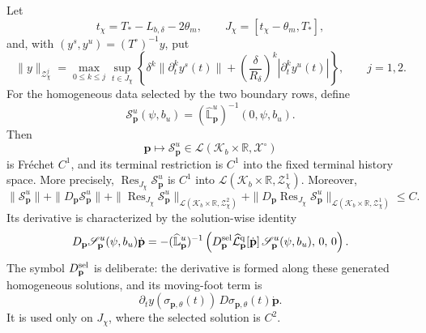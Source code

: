\begin{lemma}
Let
\begin{equation}
 t_\chi=T_*-L_{b,\delta}-2\theta_m,\qquad
 J_\chi=[t_\chi-\theta_m,T_*],                 \label{eq:oe-fixed-action-smoothing-window}
\end{equation}
and, with
\((y^s,y^u)=(T^\circ)^{-1}y\), put
\begin{equation}
 \|y\|_{\mathcal Z_\chi^j}
 =\max_{0\le k\le j}\sup_{t\in J_\chi}
 \left\{\delta^k\|\partial_t^ky^s(t)\|
       +\left(\frac{\delta}{R_\delta}\right)^k
          |\partial_t^ky^u(t)|\right\},
 \qquad j=1,2.                                 \label{eq:oe-fixed-action-terminal-strong-norm}
\end{equation}
For the homogeneous data selected by the two boundary rows, define
\begin{equation}
 \mathscr S_{\mathbf p}^{u}(\psi,b_u)
 =(\widehat{\mathbb L}_{\mathbf p}^{u})^{-1}
       (0,\psi,b_u).                           \label{eq:oe-fixed-action-selected-solution}
\end{equation}
Then
\begin{equation}
 \mathbf p\longmapsto\mathscr S_{\mathbf p}^{u}
 \in\mathcal L(\mathscr K_b\times\mathbb R,\mathcal X^\circ)
                                                        \label{eq:oe-fixed-action-selected-C1-map}
\end{equation}
is Fr\'echet \(C^1\), and its terminal restriction is \(C^1\) into
the fixed terminal history space.  More precisely,
\(\operatorname{Res}_{J_\chi}\mathscr S_{\mathbf p}^{u}\) is \(C^1\)
into
\(\mathcal L(\mathscr K_b\times\mathbb R,\mathcal Z_\chi^1)\).
Moreover,
\begin{equation}
 \|\mathscr S_{\mathbf p}^{u}\|
 +\|D_{\mathbf p}\mathscr S_{\mathbf p}^{u}\|
 +\|\operatorname{Res}_{J_\chi}\mathscr S_{\mathbf p}^{u}\|_
      {\mathcal L(\mathscr K_b\times\mathbb R,\mathcal Z_\chi^2)}
 +\|D_{\mathbf p}
       \operatorname{Res}_{J_\chi}\mathscr S_{\mathbf p}^{u}\|_
       {\mathcal L(\mathscr K_b\times\mathbb R,\mathcal Z_\chi^1)}
 \le C.                                        \label{eq:oe-fixed-action-selected-C1-bound}
\end{equation}
Its derivative is characterized by the solution-wise identity
\begin{equation}
 D_{\mathbf p}\mathscr S_{\mathbf p}^{u}
       (\psi,b_u)\dot{\mathbf p}
 =-(\widehat{\mathbb L}_{\mathbf p}^{u})^{-1}
 \left(D_{\mathbf p}^{\rm sel}
       \widehat{\mathcal L}_{\mathbf p}^{\rm q}
       [\dot{\mathbf p}]\,
       \mathscr S_{\mathbf p}^{u}(\psi,b_u),\,0,\,0\right).
                                                        \label{eq:oe-fixed-action-selected-derivative}
\end{equation}
The symbol \(D_{\mathbf p}^{\rm sel}\) is deliberate: the derivative is
formed along these generated homogeneous solutions, and its moving-foot
term is
\begin{equation}
 \partial_t y(\sigma_{\mathbf p,\theta}(t))\,
       D\sigma_{\mathbf p,\theta}(t)\dot{\mathbf p}.      \label{eq:oe-fixed-action-moving-foot-term}
\end{equation}
It is used only on \(J_\chi\), where the selected solution is \(C^2\).


\end{lemma}
